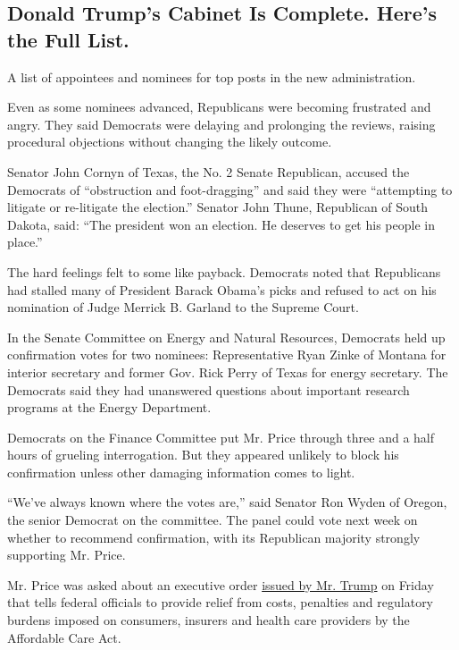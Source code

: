 \hypertarget{donald-trumps-cabinet-is-complete-heres-the-full-list}{%
\subsection{Donald Trump's Cabinet Is Complete. Here's the Full
List.}\label{donald-trumps-cabinet-is-complete-heres-the-full-list}}

A list of appointees and nominees for top posts in the new
administration.

Even as some nominees advanced, Republicans were becoming frustrated and
angry. They said Democrats were delaying and prolonging the reviews,
raising procedural objections without changing the likely outcome.

Senator John Cornyn of Texas, the No. 2 Senate Republican, accused the
Democrats of ``obstruction and foot-dragging'' and said they were
``attempting to litigate or re-litigate the election.'' Senator John
Thune, Republican of South Dakota, said: ``The president won an
election. He deserves to get his people in place.''

The hard feelings felt to some like payback. Democrats noted that
Republicans had stalled many of President Barack Obama's picks and
refused to act on his nomination of Judge Merrick B. Garland to the
Supreme Court.

In the Senate Committee on Energy and Natural Resources, Democrats held
up confirmation votes for two nominees: Representative Ryan Zinke of
Montana for interior secretary and former Gov. Rick Perry of Texas for
energy secretary. The Democrats said they had unanswered questions about
important research programs at the Energy Department.

Democrats on the Finance Committee put Mr. Price through three and a
half hours of grueling interrogation. But they appeared unlikely to
block his confirmation unless other damaging information comes to light.

``We've always known where the votes are,'' said Senator Ron Wyden of
Oregon, the senior Democrat on the committee. The panel could vote next
week on whether to recommend confirmation, with its Republican majority
strongly supporting Mr. Price.

Mr. Price was asked about an executive order
\href{https://www.nytimes.com/2017/01/20/us/politics/trump-executive-order-obamacare.html}{issued
by Mr. Trump} on Friday that tells federal officials to provide relief
from costs, penalties and regulatory burdens imposed on consumers,
insurers and health care providers by the Affordable Care Act.

